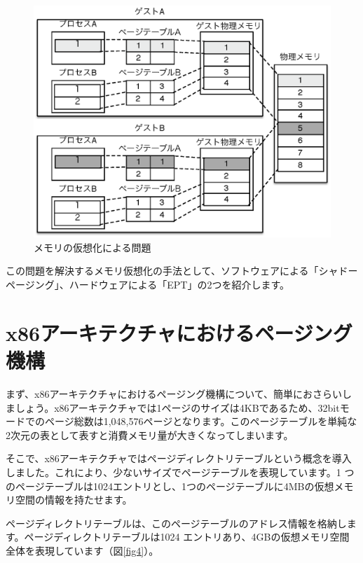 \documentclass[a4j,12pt]{jarticle}
\begin{document}
\begin{figure}
\includegraphics{figures/part2_fig3.eps}
\caption{メモリの仮想化による問題}
\label{fig3}
\end{figure}

この問題を解決するメモリ仮想化の手法として、ソフトウェアによる「シャドーページング」、ハードウェアによる「EPT」の2つを紹介します。

\section{x86アーキテクチャにおけるページング機構}
まず、x86アーキテクチャにおけるページング機構について、簡単におさらいしましょう。x86アーキテクチャでは1ページのサイズは4KBであるため、32bitモードでのページ総数は1,048,576ページとなります。このページテーブルを単純な2次元の表として表すと消費メモリ量が大きくなってしまいます。

そこで、x86アーキテクチャではページディレクトリテーブルという概念を導入しました。これにより、少ないサイズでページテーブルを表現しています。1 つのページテーブルは1024エントリとし、1つのページテーブルに4MBの仮想メモリ空間の情報を持たせます。

ページディレクトリテーブルは、このページテーブルのアドレス情報を格納します。ページディレクトリテーブルは1024 エントリあり、4GBの仮想メモリ空間全体を表現しています（図\ref{fig4}）。
\end{document}
